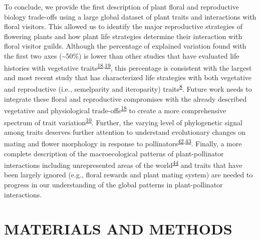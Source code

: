 \documentclass[12pt,a4paper,]{article}
\begin{document}
To conclude, we provide the first description of plant floral and
reproductive biology trade-offs using a large global dataset of plant
traits and interactions with floral visitors. This allowed us to
identify the major reproductive strategies of flowering plants and how
plant life strategies determine their interaction with floral visitor
guilds. Although the percentage of explained variation found with the
first two axes (\textasciitilde{}50\%) is lower than other studies that
have evaluated life histories with vegetative
traits\textsuperscript{\protect\hyperlink{ref-diaz2016}{18},\protect\hyperlink{ref-carmona2021}{19}},
this percentage is consistent with the largest and most recent study
that has characterized life strategies with both vegetative and
reproductive (i.e., semelparity and iteroparity)
traits\textsuperscript{\protect\hyperlink{ref-salguero2016}{8}}. Future
work needs to integrate these floral and reproductive compromises with
the already described vegetative and physiological
trade-offs\textsuperscript{\protect\hyperlink{ref-diaz2016}{18}} to
create a more comprehensive spectrum of trait
variation\textsuperscript{\protect\hyperlink{ref-roddy2021}{10}}.
Further, the varying level of phylogenetic signal among traits deserves
further attention to understand evolutionary changes on mating and
flower morphology in response to
pollinators\textsuperscript{\protect\hyperlink{ref-gervasi2017}{42},\protect\hyperlink{ref-mackin2021}{43}}.
Finally, a more complete description of the macroecological patterns of
plant-pollinator interactions including unrepresented areas of the
world\textsuperscript{\protect\hyperlink{ref-poisot2021}{44}} and traits
that have been largely ignored (e.g., floral rewards and plant mating
system) are needed to progress in our understanding of the global
patterns in plant-pollinator interactions.

\section{MATERIALS AND METHODS}\label{materials-and-methods}
\end{document}
